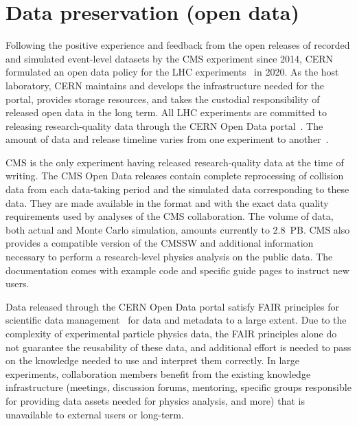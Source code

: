 \documentclass[11pt]{article}
\begin{document}
\section{Data preservation (open data)}
\label{data-preservation}

Following the positive experience and feedback from the open releases of recorded and simulated event-level datasets by the \gls{CMS} experiment since 2014, \gls{CERN} formulated an open data policy for the \gls{LHC} experiments~\cite{cern-data-policy} in 2020. As the host laboratory, \gls{CERN} maintains and develops the infrastructure needed for the portal, provides storage resources, and takes the custodial responsibility of released open data in the long term. All \gls{LHC} experiments are committed to releasing research-quality data through the \gls{CERN} Open Data portal~\cite{CODP}. The amount of data and release timeline varies from one experiment to another~\cite{cern-data-policy,cern-open-data-privacy-policy,cms-open-data-policy,atlas-open-data-policy,lhcb-open-data-policy,alice-open-data-policy}. 

\gls{CMS} is the only experiment having released research-quality data at the time of writing. The \gls{CMS} Open Data releases contain complete reprocessing of collision data from each data-taking period and the simulated data corresponding to these data. They are made available in the format and with the exact data quality requirements used by analyses of the \gls{CMS} collaboration. The volume of data, both actual and Monte Carlo simulation, amounts currently to 2.8~PB. \gls{CMS} also provides a compatible version of the \gls{CMSSW} and additional information necessary to perform a research-level physics analysis on the public data. The documentation comes with example code and specific guide pages to instruct new users.

Data released through the \gls{CERN} Open Data portal satisfy \gls{FAIR} principles for scientific data management~\cite{FAIR-paper} for data and metadata to a large extent. Due to the complexity of experimental particle physics data, the \gls{FAIR} principles alone do not guarantee the reusability of these data, and additional effort is needed to pass on the knowledge needed to use and interpret them correctly. In large experiments, collaboration members benefit from the existing knowledge infrastructure (meetings, discussion forums, mentoring, specific groups responsible for providing data assets needed for physics analysis, and more) that is unavailable to external users or long-term. 
\end{document}
